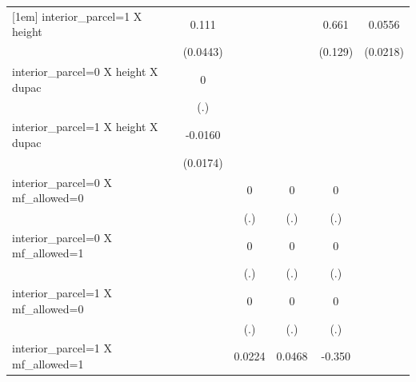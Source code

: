\begin{table}[htbp]
\begin{tabular}{l*{6}{c}}
[1em]
interior\_parcel=1 X height&                     &       0.111\sym{*}  &                     &                     &       0.661\sym{***}&      0.0556\sym{*}  \\
                    &                     &    (0.0443)         &                     &                     &     (0.129)         &    (0.0218)         \\
[1em]
interior\_parcel=0 X height X dupac&                     &           0         &                     &                     &                     &                     \\
                    &                     &         (.)         &                     &                     &                     &                     \\
[1em]
interior\_parcel=1 X height X dupac&                     &     -0.0160         &                     &                     &                     &                     \\
                    &                     &    (0.0174)         &                     &                     &                     &                     \\
[1em]
interior\_parcel=0 X mf\_allowed=0&                     &                     &           0         &           0         &           0         &                     \\
                    &                     &                     &         (.)         &         (.)         &         (.)         &                     \\
[1em]
interior\_parcel=0 X mf\_allowed=1&                     &                     &           0         &           0         &           0         &                     \\
                    &                     &                     &         (.)         &         (.)         &         (.)         &                     \\
[1em]
interior\_parcel=1 X mf\_allowed=0&                     &                     &           0         &           0         &           0         &                     \\
                    &                     &                     &         (.)         &         (.)         &         (.)         &                     \\
[1em]
interior\_parcel=1 X mf\_allowed=1&                     &                     &      0.0224         &      0.0468         &      -0.350\sym{**} &                     \\

\end{tabular}
\end{table}
